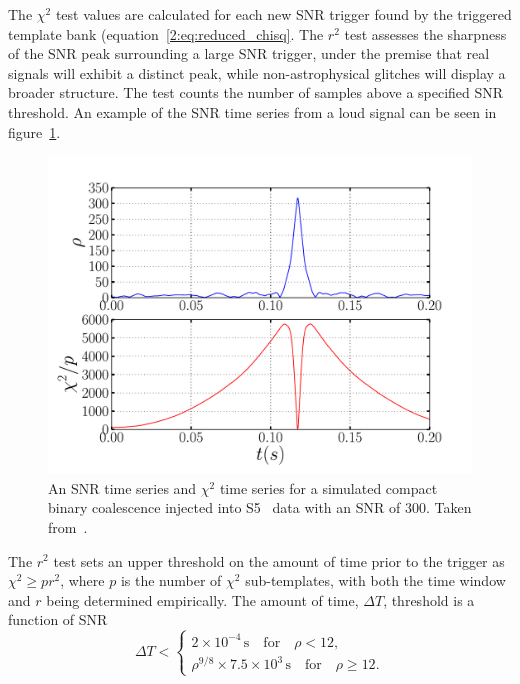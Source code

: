 The $\chi^{2}$ test values are calculated for each new SNR trigger found by the triggered template bank (equation~\ref{2:eq:reduced_chisq}. The \( r^{2} \) test assesses the sharpness of the SNR peak surrounding a large SNR trigger, under the premise that real \gwadj signals will exhibit a distinct peak, while non-astrophysical glitches will display a broader structure. The test counts the number of samples above a specified SNR threshold. An example of the SNR time series from a loud signal can be seen in figure~\ref{2:fig:ihope-snr-timeseries}.
%
\begin{figure}
    \centering
    \includegraphics[width=1.0\linewidth]{images/2_searches/ihope_snr_timeseries.pdf}
    \caption{An SNR time series and $\chi^{2}$ time series for a simulated compact binary coalescence injected into S5~\cite{S5:2012} data with an SNR of $300$. Taken from~\cite{IHOPE:2012zx}.}
    \label{2:fig:ihope-snr-timeseries}
\end{figure}
%
The \( r^{2} \) test sets an upper threshold on the amount of time prior to the trigger as \(\chi^{2} \ge p r^{2}\), where \( p \) is the number of \(\chi^{2}\) sub-templates, with both the time window and \( r \) being determined empirically. The amount of time, $\Delta T$, threshold is a function of SNR
%
\begin{equation}
    \Delta T < 
    \begin{cases}
        2 \times 10^{-4} \, \text{s} \quad \text{for} \quad \rho < 12, \\
        \rho^{9/8} \times 7.5 \times 10^{3} \, \text{s} \quad \text{for} \quad \rho \ge 12.
    \end{cases}
\end{equation}
